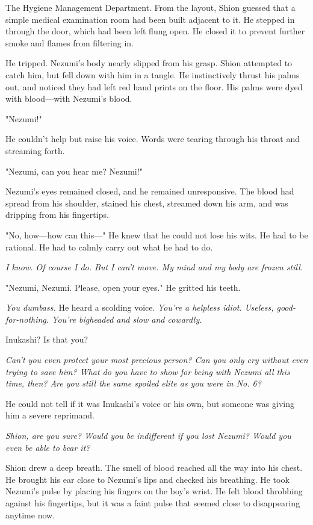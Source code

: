 The Hygiene Management Department. From the layout, Shion guessed that a
simple medical examination room had been built adjacent to it. He
stepped in through the door, which had been left flung open. He closed
it to prevent further smoke and flames from filtering in.

He tripped. Nezumi's body nearly slipped from his grasp. Shion attempted
to catch him, but fell down with him in a tangle. He instinctively
thrust his palms out, and noticed they had left red hand prints on the
floor. His palms were dyed with blood---with Nezumi's blood.

"Nezumi!"

He couldn't help but raise his voice. Words were tearing through his
throat and streaming forth.

"Nezumi, can you hear me? Nezumi!"

Nezumi's eyes remained closed, and he remained unresponsive. The blood
had spread from his shoulder, stained his chest, streamed down his arm,
and was dripping from his fingertips.

"No, how---how can this---" He knew that he could not lose his wits. He had
to be rational. He had to calmly carry out what he had to do.

\emph{I know. Of course I do. But I can't move. My mind and my body are frozen
still.}

"Nezumi, Nezumi. Please, open your eyes." He gritted his teeth.

\emph{You dumbass.} He heard a scolding voice. \emph{You're a helpless idiot.
Useless, good-for-nothing. You're bigheaded and slow and cowardly.}

Inukashi? Is that you?

\emph{Can't you even protect your most precious person? Can you only cry
without even trying to save him? What do you have to show for being with
Nezumi all this time, then? Are you still the same spoiled elite as you
were in No. 6?}

He could not tell if it was Inukashi's voice or his own, but someone was
giving him a severe reprimand.

\emph{Shion, are you sure? Would you be indifferent if you lost Nezumi? Would
you even be able to bear it?}

Shion drew a deep breath. The smell of blood reached all the way into
his chest. He brought his ear close to Nezumi's lips and checked his
breathing. He took Nezumi's pulse by placing his fingers on the boy's
wrist. He felt blood throbbing against his fingertips, but it was a
faint pulse that seemed close to disappearing anytime now.

